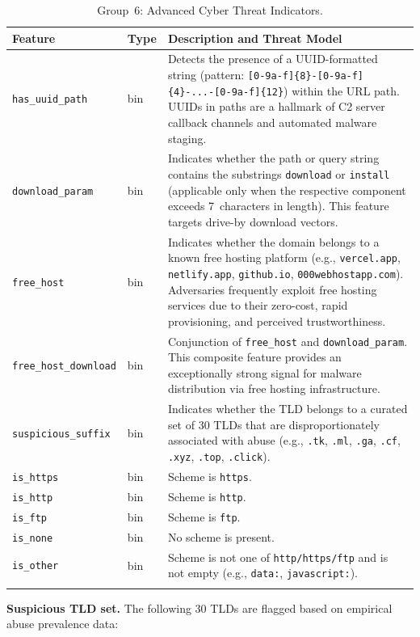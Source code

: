 \documentclass[a4paper,12pt]{article}
\begin{document}
\begin{longtable}{p{4.8cm}p{1.3cm}p{6.9cm}}
\toprule
\textbf{Feature} & \textbf{Type} & \textbf{Description and Threat Model} \\
\midrule
\endhead
\texttt{has\_uuid\_path} & bin &
    Detects the presence of a UUID-formatted string (pattern: \texttt{[0-9a-f]\{8\}-[0-9a-f]\{4\}-...-[0-9a-f]\{12\}}) within the URL path. UUIDs in paths are a hallmark of C2 server callback channels and automated malware staging. \\
\texttt{download\_param} & bin &
    Indicates whether the path or query string contains the substrings \texttt{download} or \texttt{install} (applicable only when the respective component exceeds 7~characters in length). This feature targets drive-by download vectors. \\
\texttt{free\_host} & bin &
    Indicates whether the domain belongs to a known free hosting platform (e.g., \texttt{vercel.app}, \texttt{netlify.app}, \texttt{github.io}, \texttt{000webhostapp.com}). Adversaries frequently exploit free hosting services due to their zero-cost, rapid provisioning, and perceived trustworthiness. \\
\texttt{free\_host\_download} & bin &
    Conjunction of \texttt{free\_host} and \texttt{download\_param}. This composite feature provides an exceptionally strong signal for malware distribution via free hosting infrastructure. \\
\texttt{suspicious\_suffix} & bin &
    Indicates whether the TLD belongs to a curated set of 30 TLDs that are disproportionately associated with abuse (e.g., \texttt{.tk}, \texttt{.ml}, \texttt{.ga}, \texttt{.cf}, \texttt{.xyz}, \texttt{.top}, \texttt{.click}). \\
\texttt{is\_https} & bin & Scheme is \texttt{https}. \\
\texttt{is\_http}  & bin & Scheme is \texttt{http}. \\
\texttt{is\_ftp}   & bin & Scheme is \texttt{ftp}. \\
\texttt{is\_none}  & bin & No scheme is present. \\
\texttt{is\_other} & bin & Scheme is not one of \texttt{http/https/ftp} and is not empty (e.g., \texttt{data:}, \texttt{javascript:}). \\
\bottomrule
\caption{Group~6: Advanced Cyber Threat Indicators.}
\label{tab:advanced}
\end{longtable}

\textbf{Suspicious TLD set.} The following 30 TLDs are flagged based on empirical abuse prevalence data:
\end{document}
